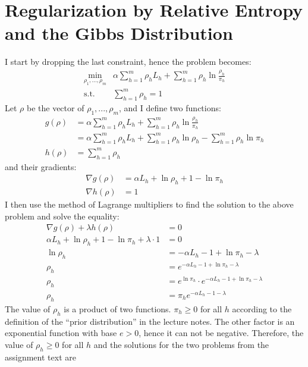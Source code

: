 \documentclass[a4paper]{article}
\begin{document}
\section{Regularization by Relative Entropy and the Gibbs Distribution}
\label{sec:2}
I start by dropping the last constraint, hence the problem becomes:
\[
\begin{array}
  {ll}{\min _{\rho_{1}, \ldots, \rho_{m}}} &
  {\alpha \sum_{h=1}^{m} \rho_{h} L_{h}+\sum_{h=1}^{m} \rho_{h} \ln \frac{\rho_{h}}{\pi_{h}}} \\
  {\text {s.t.}} & {\sum_{h=1}^{m} \rho_{h}=1}
\end{array}
\]
Let $\rho$ be the vector of $\rho_1,...,\rho_m$, and
I define two functions:
\begin{align*}
g(\rho) &= \alpha \sum_{h=1}^{m} \rho_{h} L_{h}+\sum_{h=1}^{m} \rho_{h} \ln \frac{\rho_{h}}{\pi_{h}}\\
&= \alpha \sum_{h=1}^{m} \rho_{h} L_{h}+\sum_{h=1}^{m} \rho_{h} \ln \rho_{h} - \sum_{h=1}^{m}\rho_{h} \ln \pi_{h}\\
h(\rho) &= \sum_{h=1}^{m} \rho_{h} 
\end{align*}
and their gradients:
\begin{align*}
  \nabla g(\rho) &= \alpha L_{h} + \ln \rho_{h} + 1 - \ln \pi_{h}\\
  \nabla h(\rho) &= 1
\end{align*}
I then use the method of Lagrange multipliers to find the solution to the above
problem and solve the equality:  
\begin{align*}
  \nabla g(\rho) + \lambda h(\rho) &= 0\\
  \alpha L_{h} + \ln \rho_{h} + 1 - \ln \pi_{h} + \lambda \cdot 1 &= 0\\
  \ln \rho_{h} &= -\alpha L_{h} - 1 + \ln \pi_{h} - \lambda\\
  \rho_{h} &= e^{-\alpha L_{h} - 1 + \ln \pi_{h} - \lambda}\\
  \rho_{h} &= e^{\ln \pi_h} \cdot e^{-\alpha L_{h} - 1 + \ln \pi_{h} - \lambda}\\
  \rho_{h} &= \pi_{h}e^{-\alpha L_{h} - 1 - \lambda} 
\end{align*}
The value of $\rho_h$ is a product of two functions. $\pi_h \geq 0$ for all $h$
according to the definition of the ``prior distribution'' in the lecture notes.
The other factor is an exponential function with base $e>0$,
hence it can not be negative. Therefore, the value of $\rho_h \geq 0$ for all
$h$ and the solutions for the two problems from the assignment text are
\end{document}
